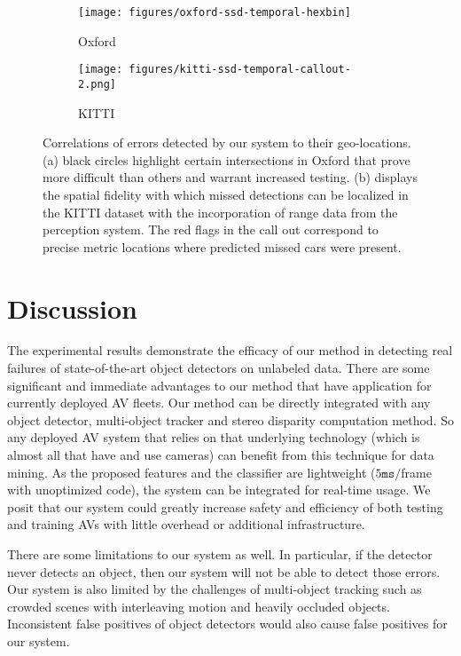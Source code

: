 \documentclass[letterpaper, 10 pt, journal, twoside]{IEEEtran}  %
\begin{document}
\begin{figure}[th]
    \centering
    \begin{subfigure}[t]{0.4\linewidth}
        \texttt{[image: figures/oxford-ssd-temporal-hexbin]}
        \caption{Oxford}
        \label{fig:oxford}
    \end{subfigure}
    \begin{subfigure}[t]{\linewidth}
        \texttt{[image: figures/kitti-ssd-temporal-callout-2.png]}
        \caption{KITTI}
        \label{fig:kitti}
    \end{subfigure}
    \caption{Correlations of errors detected by our system to their geo-locations. (a) black circles highlight certain intersections in Oxford that prove more difficult than others and warrant increased testing. (b) displays the spatial fidelity with which missed detections can be localized in the KITTI dataset with the incorporation of range data from the perception system. The red flags in the call out correspond to precise metric locations where predicted missed cars were present.}
    \label{fig:spatial_errors_map}
\end{figure}


\section{Discussion}
\label{sec:discussion}
The experimental results demonstrate the efficacy of our method in detecting real
failures of state-of-the-art object detectors on unlabeled data. 
There are some significant and immediate advantages to our method that have application for currently deployed AV fleets. Our method can be directly integrated with any object detector, 
multi-object tracker and stereo disparity computation method. So any deployed AV system that relies on that underlying technology (which is almost all that have and use cameras) can benefit from this technique for data mining. As the proposed features and the classifier are lightweight ($5 \mathtt{ms}/$frame with unoptimized code), the system can be integrated for real-time usage. We posit that our system could greatly increase safety and efficiency of both testing and training AVs with little overhead or additional infrastructure. 

There are some limitations to our system as well. In particular, if the detector never detects an object, then our system will not be able to detect those errors. 
Our system is also limited by the challenges of multi-object tracking such as crowded scenes with interleaving motion and heavily
occluded objects\cite{luo2014multiple}. Inconsistent false positives of object detectors would also cause false positives for our system.
\end{document}
